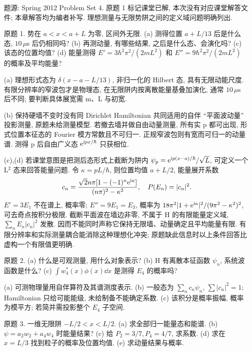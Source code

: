 题源: Spring 2012 Problem Set 4. 原题 1 标记课堂已解, 本次没有对应课堂解答文件; 本章解答均为编者补写. 理想测量与无限势阱之间的定义域问题明确列出.
\begin{exercise}\label{ex:2202-4-1}
原题 1. 势在 $a<x<a+L$ 为零, 区间外无限. (a) 测得位置 $a+L/13$ 后是什么态, $10\,\mu$s 后仍相同吗? (b) 再测动量, 有哪些结果, 之后是什么态、会演化吗? (c) 该态的位置均值? (d) 能量测得 $E'=3\hbar^2\pi^2/(2mL^2)$ 和 $E''=9\hbar^2\pi^2/(2mL^2)$ 的概率及平均能量?
\end{exercise}
\begin{solution}
(a) 理想形式态为 $\delta(x-a-L/13)$, 非归一化的 Hilbert 态, 具有无限动能尺度. 有限分辨率的窄波包才是物理态, 在无限阱内按离散能量基叠加演化, 通常 $10\,\mu$s 后不同; 要判断具体展宽需 m、L 与初宽.

(b) 保持硬墙不变时没有同 Dirichlet Hamiltonian 共同适用的自伴 ``平面波动量'' 投影测量, 原题未给测量模型. 若撤去墙并做自由动量测量, 所有实 p 都可出现, 形式位置本征态的 Fourier 模方常数且不可归一. 正规窄波包则有宽而可归一的动量谱. 测得 p 后自由广义态 $\mathrm e^{\mathrm i px/\hbar}$ 只获相位.

(c),(d) 若课堂意图是把测后态形式上截断为阱内 $\psi_p=\mathrm e^{\mathrm i p(x-a)/\hbar}/\sqrt L$, 可定义一个 L$^2$ 态来回答能量问题. 令 $\kappa=pL/\hbar$, 则位置均值 $a+L/2$, 能量展开系数
\begin{equation}
 c_n=\frac{\sqrt2n\pi[1-(-1)^n\mathrm e^{\mathrm i\kappa}]}{(n\pi)^2-\kappa^2},\quad P(E_n)=|c_n|^2.
\end{equation}
$E'=3E_1$ 不在谱上, 概率零; $E''=9E_1=E_3$, 概率为 $18\pi^2|1+\mathrm e^{\mathrm i\kappa}|^2/(9\pi^2-\kappa^2)^2$, 可去奇点按积分极限. 截断平面波在墙边非零, 不属于 H 的有限能量定义域, $\sum_nE_n|c_n|^2$ 发散. 因而不能同时声称它保持无限墙、动量确定且平均能量有限. 有限分辨率和实际测量耦合能消除这种理想化冲突; 原题缺此信息时以上条件回答比虚构一个有限值更明确.
\end{solution}
\begin{exercise}\label{ex:2202-4-2}
原题 2. (a) 什么是可观测量, 用什么对象表示? (b) H 有离散本征函数 $\psi_n$, 系统波函数是什么? (c) $\int w_4^*(x)\phi(x)\dd x$ 是测得 $E_4$ 的概率吗?
\end{exercise}
\begin{solution}
(a) 可测物理量用自伴算符及其谱测度表示. (b) 一般态为 $\sum_nc_n\psi_n$, $\sum|c_n|^2=1$; Hamiltonian 只给可能能级, 未给制备不能确定系数. (c) 该积分是概率振幅, 概率为模平方; 若简并需投影整个 $E_4$ 子空间.
\end{solution}
\begin{exercise}\label{ex:2202-4-3}
原题 3. 一维无限阱 $-L/2<x<L/2$. (a) 求全部归一能量态和能谱. (b) $\psi=a_2w_2+a_4w_4$ 时能量结果? (c) 给 $P_2=3/7,P_4=4/7$, 求系数. (d) 求在 $x=L/3$ 找到粒子的概率及位置均值. (e) 求动量结果与概率.
\end{exercise}
